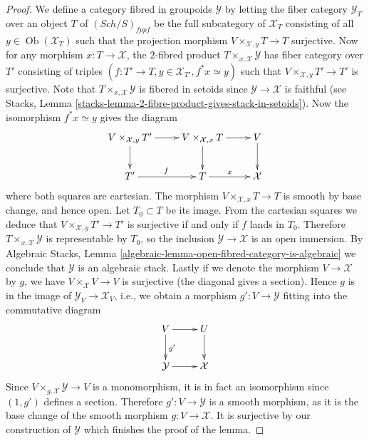 \documentclass[10pt,a4paper]{amsart}
\theoremstyle{plain}
\theoremstyle{definition}
\theoremstyle{remark}
\numberwithin{equation}{subsection}
\def\Sch{\mathit{Sch}}
\def\Ob{\mathop{\mathrm{Ob}}\nolimits}
\begin{document}
\begin{proof}
We define a category fibred in groupoids $\mathcal Y$ by letting the fiber
category $\mathcal{Y}_T$ over an object $T$ of $(\Sch/S)_{fppf}$ be
the full subcategory of $\mathcal{X}_T$ consisting of all
$y \in \Ob(\mathcal{X}_T)$ such that the projection morphism
$V \times_{\mathcal X, y} T \to T$ surjective. Now for any morphism
$x : T \to \mathcal X$, the $2$-fibred product
$T \times_{x, \mathcal X} \mathcal Y$ has fiber category over $T'$ consisting
of triples $(f : T' \to T, y \in \mathcal{X}_{T'}, f^*x \simeq y)$ such that
$V \times_{\mathcal X, y} T' \to T'$ is surjective.
Note that $T \times_{x, \mathcal X} \mathcal Y$ is fibered in setoids since
$\mathcal Y \to \mathcal X$ is faithful (see
Stacks, Lemma \ref{stacks-lemma-2-fibre-product-gives-stack-in-setoids}).
Now the isomorphism $f^*x \simeq y$ gives the diagram
$$
\xymatrix{
V \times_{\mathcal X, y} T' \ar[d] \ar[r] &
V \times_{\mathcal X, x} T \ar[r] \ar[d] &
V \ar[d] \\
T' \ar[r]^f &
T \ar[r]^x &
\mathcal X
}
$$
where both squares are cartesian. The morphism
$V \times_{\mathcal X, x} T \to T$ is smooth by base change, and hence open.
Let $T_0 \subset T$ be its image. From the cartesian squares we deduce that
$V \times_{\mathcal X, y} T' \to T'$ is surjective if and only if $f$ lands
in $T_0$.  Therefore $T \times_{x, \mathcal X} \mathcal Y$ is representable by
$T_0$, so the inclusion $\mathcal Y \to \mathcal X$ is an open immersion.
By
Algebraic Stacks, Lemma \ref{algebraic-lemma-open-fibred-category-is-algebraic}
we conclude that $\mathcal{Y}$ is an algebraic stack.
Lastly if we denote the morphism $V \to \mathcal X$ by $g$, we have
$V \times_{\mathcal X} V \to V$ is surjective (the diagonal gives a
section). Hence $g$ is in the image of $\mathcal{Y}_V \to \mathcal{X}_V$, i.e.,
we obtain a morphism $g' : V \to \mathcal{Y}$ fitting into the commutative
diagram
$$
\xymatrix{
V \ar[r] \ar[d]^{g'} & U \ar[d] \\
\mathcal{Y} \ar[r] & \mathcal{X}
}
$$
Since $V \times_{g, \mathcal X} \mathcal Y \to V$ is a
monomorphism, it is in fact an isomorphism since $(1, g')$ defines a section.
Therefore $g' : V \to \mathcal Y$ is a smooth morphism, as it is the
base change of the smooth morphism $g : V \to \mathcal{X}$.
It is surjective by our construction of $\mathcal{Y}$ which finishes
the proof of the lemma.
\end{proof}
\end{document}
